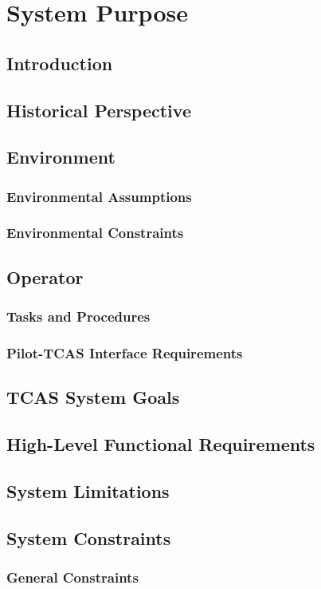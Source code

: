 \documentclass[12pt]{report}
\begin{document}
\tableofcontents

\chapter{System Purpose}
\section{Introduction}
\section{Historical Perspective}
\section{Environment}
\subsection{Environmental Assumptions}
\subsection{Environmental Constraints}
\section{Operator}
\subsection{Tasks and Procedures}
\subsection{Pilot-TCAS Interface Requirements}
\section{TCAS System Goals}
\section{High-Level Functional Requirements}
\section{System Limitations}
\section{System Constraints}
\subsection{General Constraints}
\end{document}
